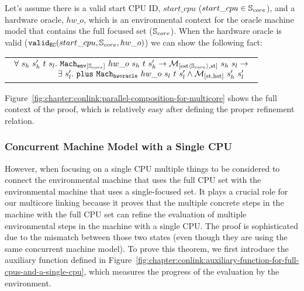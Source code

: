 \begin{lemma}
\label{lemma:chapter:conlink:mc-oracle-env}
Let's assume  there is a valid start CPU ID,
$start\_cpu$ ($start\_cpu \in {\mathbb{S}_{core}}$), and a hardware oracle, $hw\_o$,  
which is an environmental context for the oracle machine model that contains the full focused set (${\mathbb{S}_{core}}$).
When the hardware oracle is valid (${{\mathrm{\texttt{valid}}}_{{\mathrm{\texttt{EC}}}}}({start\_cpu}, {{\mathbb{S}_{core}}}, {hw\_o})$) we can show the following fact:
\begin{center}
\begin{tabular}{P{0.95\textwidth}}
$
\begin{array}{l}
\forall \ s_h \ s_h' \ t \ s_l . \ {{{{\mathrm{\texttt{Mach}}}}_{{\mathrm{\texttt{env}}}}}_{[{{\mathbb{S}_{core}}}]}~{hw\_o }~{s_h}~{t}~{s_h'}} \rightarrow  {{\mathcal{M}_{[\mathrm{est}\langle{\mathbb{S}_{core}}\rangle,\mathrm{st}]}}~{s_h}~{s_l}} \rightarrow \\
\ \ \ \ \ \ \ \ \ \ \ \ \ \ \ \ \exists\ s_l' . \  {{{\mathrm{\texttt{plus}}}}~{{{{{{\mathrm{\texttt{Mach}}}}_{{\mathrm{\texttt{hworacle}}}}}}~{hw\_o }~{s_l}~{t}~{s_l'}}}} \wedge  {{\mathcal{M}_{[\mathrm{st},\mathrm{hst}]}}~{s_h'}~{s_l'}}\\
\end{array}
$\\
\end{tabular}
\end{center}
\end{lemma}

Figure~\ref{fig:chapter:conlink:parallel-composition-for-multicore} shows the full context of the proof, which is relatively easy after defining the proper refinement relation. 

\subsubsection{Concurrent Machine Model with a Single CPU}


However, when  focusing on a single CPU
multiple things to be considered to connect the environmental machine that uses the full CPU set  
with the environmental machine that uses a single-focused set.
It plays a crucial role 
for our multicore linking because it proves that the multiple concrete steps  in the machine with the full CPU set can
 refine the evaluation of multiple environmental steps in the machine with a single CPU.
The proof is sophisticated due to the mismatch between those two  states (even though they are 
using the same concurrent machine model).
To prove this theorem, 
we first introduce the auxiliary function defined in Figure~\ref{fig:chapter:conlink:auxiliary-function-for-full-cpus-and-a-single-cpu},
which measures the progress of the evaluation by the environment. 


